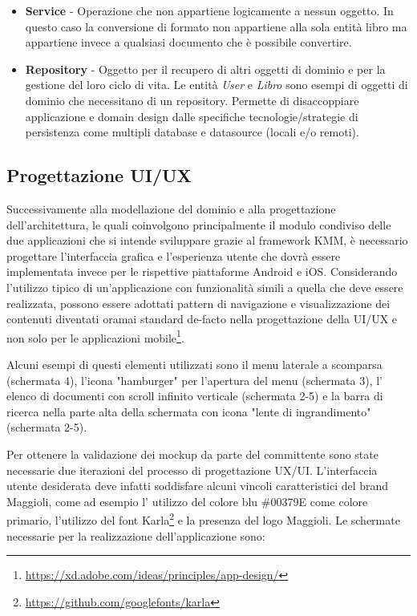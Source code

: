 \begin{itemize}
    \item \textbf{Service} - Operazione che non appartiene logicamente a nessun oggetto. In questo caso la conversione di formato non appartiene alla sola entità libro ma appartiene invece a qualsiasi documento che è possibile convertire.
    
    \item \textbf{Repository} - Oggetto per il recupero di altri oggetti di dominio e per la gestione del loro ciclo di vita. Le entità \textit{User} e \textit{Libro} sono esempi di oggetti di dominio che necessitano di un repository. Permette di disaccoppiare applicazione e domain design dalle specifiche tecnologie/strategie di persistenza come multipli database e datasource (locali e/o remoti).
\end{itemize}

\subsection{Progettazione UI/UX}
Successivamente alla modellazione del dominio e alla progettazione dell'architettura, 
le quali coinvolgono principalmente il modulo condiviso delle due applicazioni che si intende sviluppare grazie al framework KMM,
è necessario progettare l'interfaccia grafica e l'esperienza utente che dovrà essere implementata invece per le rispettive piattaforme Android e iOS. 
Considerando l'utilizzo tipico di un'applicazione con funzionalità simili a quella che deve essere realizzata,
possono essere adottati pattern di navigazione e visualizzazione dei contenuti diventati oramai standard de-facto nella progettazione della UI/UX e non solo per le applicazioni mobile\footnote{\href{https://xd.adobe.com/ideas/principles/app-design/}{https://xd.adobe.com/ideas/principles/app-design/}}.

Alcuni esempi di questi elementi utilizzati sono il menu laterale a scomparsa (schermata 4), 
l'icona "hamburger" per l'apertura del menu (schermata 3), 
l' elenco di documenti con scroll infinito verticale (schermata 2-5) e la barra di ricerca nella parte alta della schermata con icona "lente di ingrandimento" (schermata 2-5). 

Per ottenere la validazione dei mockup da parte del committente sono state necessarie due iterazioni del processo di progettazione UX/UI.
L'interfaccia utente desiderata deve infatti soddisfare alcuni vincoli caratteristici del brand Maggioli, 
come ad esempio l' utilizzo del colore blu \#00379E come colore primario, 
l'utilizzo del font Karla\footnote{\href{https://github.com/googlefonts/karla}{https://github.com/googlefonts/karla}} e la presenza del logo Maggioli. 
Le schermate necessarie per la realizzazione dell'applicazione sono:

